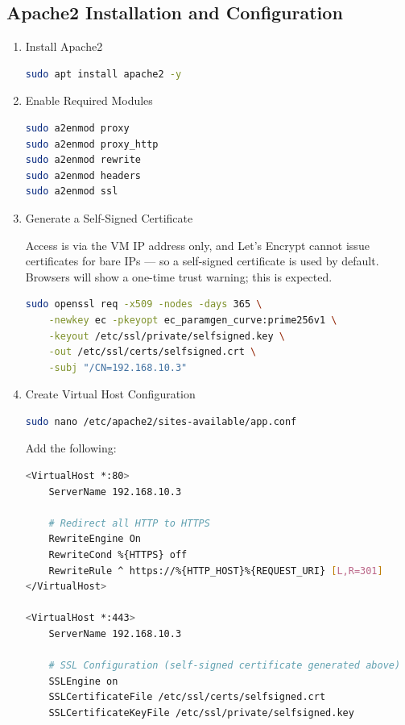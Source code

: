 \documentclass[12pt,a4paper]{report}
\begin{document}
\subsection{Apache2 Installation and Configuration}

\begin{enumerate}
\item Install Apache2
\begin{lstlisting}[language=bash]
sudo apt install apache2 -y
\end{lstlisting}

\item Enable Required Modules
\begin{lstlisting}[language=bash]
sudo a2enmod proxy
sudo a2enmod proxy_http
sudo a2enmod rewrite
sudo a2enmod headers
sudo a2enmod ssl
\end{lstlisting}

\item Generate a Self-Signed Certificate
\begin{markdownnote}
Access is via the VM IP address only, and Let's Encrypt cannot issue certificates for bare IPs — so a self-signed certificate is used by default. Browsers will show a one-time trust warning; this is expected.
\end{markdownnote} 
\begin{lstlisting}[language=bash]
sudo openssl req -x509 -nodes -days 365 \
    -newkey ec -pkeyopt ec_paramgen_curve:prime256v1 \
    -keyout /etc/ssl/private/selfsigned.key \
    -out /etc/ssl/certs/selfsigned.crt \
    -subj "/CN=192.168.10.3"
\end{lstlisting}
\item Create Virtual Host Configuration
\begin{lstlisting}[language=bash]
sudo nano /etc/apache2/sites-available/app.conf
\end{lstlisting}
Add the following:
\begin{lstlisting}[language=bash]
<VirtualHost *:80>
    ServerName 192.168.10.3

    # Redirect all HTTP to HTTPS
    RewriteEngine On
    RewriteCond %{HTTPS} off
    RewriteRule ^ https://%{HTTP_HOST}%{REQUEST_URI} [L,R=301]
</VirtualHost>

<VirtualHost *:443>
    ServerName 192.168.10.3

    # SSL Configuration (self-signed certificate generated above)
    SSLEngine on
    SSLCertificateFile /etc/ssl/certs/selfsigned.crt
    SSLCertificateKeyFile /etc/ssl/private/selfsigned.key


\end{lstlisting}
\end{enumerate}
\end{document}

